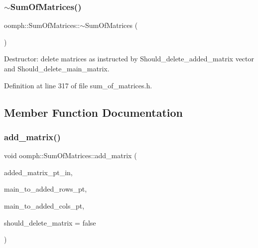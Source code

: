 \subsubsection{\texorpdfstring{$\sim$\+Sum\+Of\+Matrices()}{~SumOfMatrices()}}
{\footnotesize\ttfamily oomph\+::\+Sum\+Of\+Matrices\+::$\sim$\+Sum\+Of\+Matrices (\begin{DoxyParamCaption}{ }\end{DoxyParamCaption})\hspace{0.3cm}{\ttfamily [inline]}}

Destructor\+: delete matrices as instructed by Should\+\_\+delete\+\_\+added\+\_\+matrix vector and Should\+\_\+delete\+\_\+main\+\_\+matrix. 

Definition at line 317 of file sum\+\_\+of\+\_\+matrices.\+h.



\subsection{Member Function Documentation}
\mbox{\label{classoomph_1_1SumOfMatrices_a950924dfc285c908aac317f3be4fd158}} 
\subsubsection{\texorpdfstring{add\+\_\+matrix()}{add\_matrix()}}
{\footnotesize\ttfamily void oomph\+::\+Sum\+Of\+Matrices\+::add\+\_\+matrix (\begin{DoxyParamCaption}\item[{\hyperlink{classoomph_1_1DoubleMatrixBase}{Double\+Matrix\+Base} $\ast$}]{added\+\_\+matrix\+\_\+pt\+\_\+in,  }\item[{const \hyperlink{classoomph_1_1AddedMainNumberingLookup}{Added\+Main\+Numbering\+Lookup} $\ast$}]{main\+\_\+to\+\_\+added\+\_\+rows\+\_\+pt,  }\item[{const \hyperlink{classoomph_1_1AddedMainNumberingLookup}{Added\+Main\+Numbering\+Lookup} $\ast$}]{main\+\_\+to\+\_\+added\+\_\+cols\+\_\+pt,  }\item[{bool}]{should\+\_\+delete\+\_\+matrix = {\ttfamily false} }\end{DoxyParamCaption})\hspace{0.3cm}{\ttfamily [inline]}}



